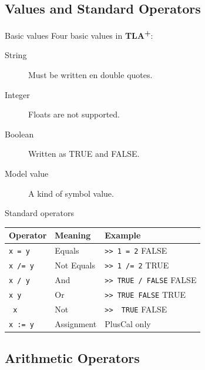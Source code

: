 \documentclass[10pt]{beamer}
\newcommand{\tlaplus}{\textbf{\textsc{TLA\textsuperscript{+}}}\xspace}
\begin{document}
\subsection{Values and Standard Operators}

\begin{frame}{Basic values}
  Four basic values in \tlaplus:
  \begin{description}
    \item[String] Must be written en double quotes.
    \item[Integer] Floats are not supported.
    \item[Boolean] Written as TRUE and FALSE.
    \item[Model value] A kind of symbol value.
  \end{description}
\end{frame}

\begin{frame}{Standard operators}
  \begin{table}
    \begin{tabular}{@{} p{2cm}lp{3cm} @{}}
      \toprule
      Operator & Meaning & Example\\
      \midrule
      \texttt{x = y} & Equals & \texttt{>> 1 = 2} \newline FALSE \\
      \texttt{x /= y} & Not Equals & \texttt{>> 1 /= 2} \newline TRUE\\
      \texttt{x /\ y} & And & \texttt{>> TRUE /\ FALSE} \newline FALSE\\
      \texttt{x \/ y} & Or & \texttt{>> TRUE \/ FALSE} \newline TRUE\\
      \texttt{~x} & Not & \texttt{>> ~TRUE} \newline FALSE\\      
      \texttt{x := y} & Assignment & PlusCal only\\
      \bottomrule
    \end{tabular}
  \end{table}
\end{frame}

\subsection{Arithmetic Operators}
\end{document}
